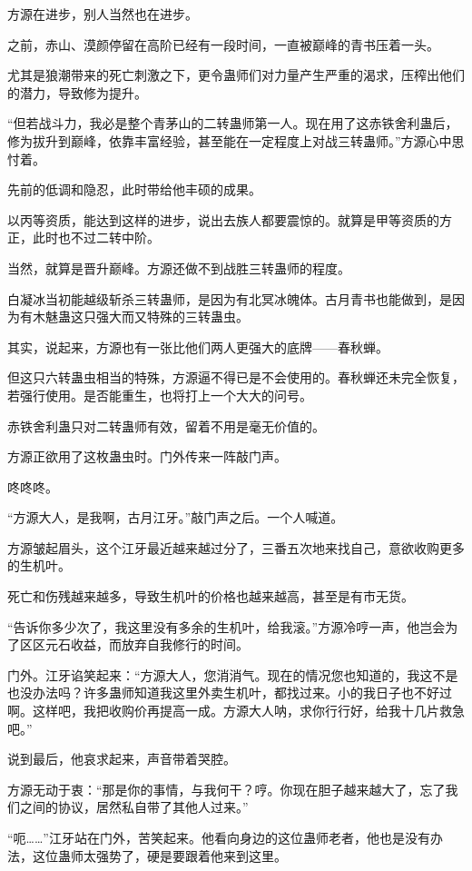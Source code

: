 \begin{this_body}
方源在进步，别人当然也在进步。

之前，赤山、漠颜停留在高阶已经有一段时间，一直被巅峰的青书压着一头。

尤其是狼潮带来的死亡刺激之下，更令蛊师们对力量产生严重的渴求，压榨出他们的潜力，导致修为提升。

“但若战斗力，我必是整个青茅山的二转蛊师第一人。现在用了这赤铁舍利蛊后，修为拔升到巅峰，依靠丰富经验，甚至能在一定程度上对战三转蛊师。”方源心中思忖着。

先前的低调和隐忍，此时带给他丰硕的成果。

以丙等资质，能达到这样的进步，说出去族人都要震惊的。就算是甲等资质的方正，此时也不过二转中阶。

当然，就算是晋升巅峰。方源还做不到战胜三转蛊师的程度。

白凝冰当初能越级斩杀三转蛊师，是因为有北冥冰魄体。古月青书也能做到，是因为有木魅蛊这只强大而又特殊的三转蛊虫。

其实，说起来，方源也有一张比他们两人更强大的底牌——春秋蝉。

但这只六转蛊虫相当的特殊，方源逼不得已是不会使用的。春秋蝉还未完全恢复，若强行使用。是否能重生，也将打上一个大大的问号。

赤铁舍利蛊只对二转蛊师有效，留着不用是毫无价值的。

方源正欲用了这枚蛊虫时。门外传来一阵敲门声。

咚咚咚。

“方源大人，是我啊，古月江牙。”敲门声之后。一个人喊道。

方源皱起眉头，这个江牙最近越来越过分了，三番五次地来找自己，意欲收购更多的生机叶。

死亡和伤残越来越多，导致生机叶的价格也越来越高，甚至是有市无货。

“告诉你多少次了，我这里没有多余的生机叶，给我滚。”方源冷哼一声，他岂会为了区区元石收益，而放弃自我修行的时间。

门外。江牙谄笑起来：“方源大人，您消消气。现在的情况您也知道的，我这不是也没办法吗？许多蛊师知道我这里外卖生机叶，都找过来。小的我日子也不好过啊。这样吧，我把收购价再提高一成。方源大人呐，求你行行好，给我十几片救急吧。”

说到最后，他哀求起来，声音带着哭腔。

方源无动于衷：“那是你的事情，与我何干？哼。你现在胆子越来越大了，忘了我们之间的协议，居然私自带了其他人过来。”

“呃……”江牙站在门外，苦笑起来。他看向身边的这位蛊师老者，他也是没有办法，这位蛊师太强势了，硬是要跟着他来到这里。


\end{this_body}
